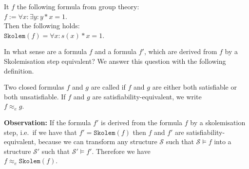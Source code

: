 \exampleEng
It $f$ the following formula from group theory:
\\[0.2cm]
\hspace*{1.3cm}
$f := \forall x: \exists y: y * x = 1$. 
\\[0.2cm]
Then the following holds:
\\[0.2cm]
\hspace*{1.3cm}
$\mathtt{Skolem}(f) = \forall x : s(x) * x = 1$.  \eox

\noindent
In what sense are a formula $f$ and a formula $f'$, which are derived from $f$ by a 
Skolem\-isation step equivalent?  We answer this question with the following definition. 

\begin{Definition} \hspace*{\fill} \linebreak
   Two closed formulas $f$ and $g$ are called 
   if $f$ and $g$ are either both satisfiable or both unsatisfiable.
   If $f$ and $g$ are satisfiability-equivalent, we write \\[0.2cm]
   \hspace*{1.3cm} $f \approx_e g$.
\eox
\end{Definition}

\noindent
\textbf{Observation:}
If the formula $f'$ is derived from the formula $f$ by a skolemisation step, i.e.~if we have that $f' = \mathtt{Skolem} (f)$
then $f$ and $f'$ are satisfiability-equivalent, because we can transform any structure
$\mathcal{S}$ such that $\mathcal{S} \models f$ into a structure $\mathcal{S}'$ such that
$\mathcal{S}' \models f'$.  Therefore we have
\\[0.2cm]
\hspace*{1.3cm}
$f \approx_e \mathtt{Skolem}(f)$. \eox


